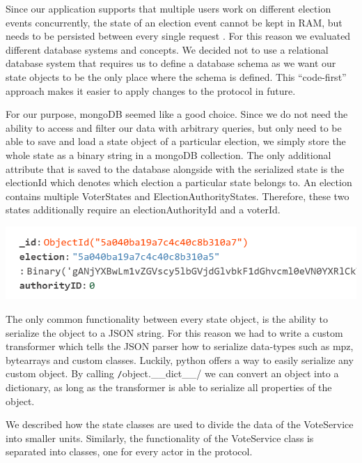 Since our application supports that multiple users work on different election events concurrently, the state of an election event cannot be kept in RAM, but needs to be persisted between every single request . For this reason we evaluated different database systems and concepts. We decided not to use a relational database system that requires us to define a database schema as we want our state objects to be the only place where the schema is defined. This "`code-first"' approach makes it easier to apply changes to the protocol in future. 

For our purpose, mongoDB seemed like a good choice. Since we do not need the ability to access and filter our data with arbitrary queries, but only need to be able to save and load a state object of a particular election, we simply store the whole state as a binary string in a mongoDB collection. The only additional attribute that is saved to the database alongside with the serialized state is the electionId which denotes which election a particular state belongs to. An election contains multiple VoterStates and ElectionAuthorityStates. Therefore, these two states additionally require an electionAuthorityId and a voterId.

\begin{center}
\includegraphics[scale=0.62]{assets/db.png}
\label{Example: ElectionAuthority document collection}%
\end{center}

The only common functionality between every state object, is the ability to serialize the object to a JSON string. For this reason we had to write a custom transformer which tells the JSON parser how to serialize data-types such as mpz, bytearrays and custom classes. Luckily, python offers a way to easily serialize any custom object. By calling \texttt/object.__dict__/ we can convert an object into a dictionary, as long as the transformer is able to serialize all properties of the object.

We described how the state classes are used to divide the data of the VoteService into smaller units. Similarly, the functionality of the VoteService class is separated into classes, one for every actor in the protocol.

